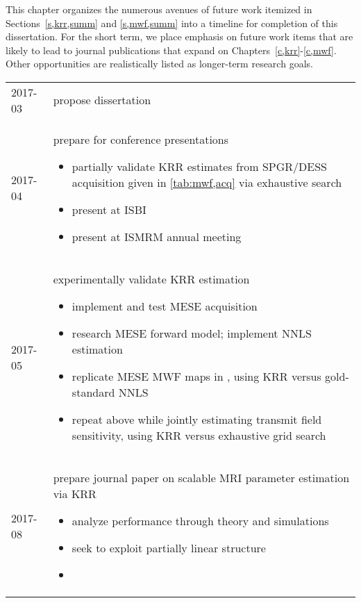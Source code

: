 
This chapter organizes the numerous avenues 
of future work itemized 
in Sections~\ref{s,krr,summ} and \ref{s,mwf,summ}
into a timeline for completion 
of this dissertation.
For the short term,
we place emphasis
on future work items
that are likely 
to lead 
to journal publications
that expand 
on Chapters~\ref{c,krr}-\ref{c,mwf}.
Other opportunities
are realistically listed 
as longer-term research goals.

\begin{table}[!ht]
	\centering
	\begin{tabular}{l | p{12cm}}
		\hline 
		\hline
		2017-03 & propose dissertation \\
		2017-04 & prepare for conference presentations
			\begin{itemize}
				\setlength\topsep{0em}
				\setlength\itemsep{0em}
				\item{
					partially validate KRR estimates 
					from SPGR/DESS acquisition 
					given in \ref{tab:mwf,acq}
					via exhaustive search
				}
				\item{present \cite{nataraj:17:dfm} at ISBI}
				\item{present \cite{nataraj:17:mwf} at ISMRM annual meeting}
			\end{itemize} \\
		2017-05 & experimentally validate KRR estimation
			\begin{itemize}
				\setlength\topsep{0em}
				\setlength\itemsep{0em}
				\item{implement and test MESE acquisition}
				\item{research MESE forward model; implement NNLS estimation}
				\item{
					replicate \invivo MESE MWF maps in \cite{zhang:15:com},
					using KRR versus gold-standard NNLS
				}
				\item{
					repeat above while jointly estimating transmit field sensitivity,
					using KRR versus exhaustive grid search
				}
			\end{itemize} \\
		2017-08 & prepare journal paper on scalable MRI parameter estimation via KRR
			\begin{itemize}
				\setlength\topsep{0em}
				\setlength\itemsep{0em}
				\item{analyze performance through theory and simulations}
				\item{seek to exploit partially linear structure}
				\item{
}
\end{itemize}
\end{tabular}
\end{table}
